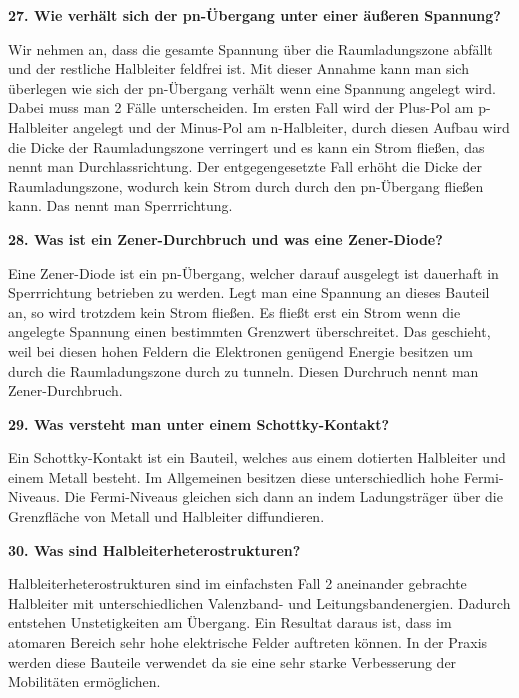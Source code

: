 \noindent\textbf{27. Wie verhält sich der pn-Übergang unter einer äußeren Spannung?}\\
\begin{addmargin}[25pt]{0pt}
Wir nehmen an, dass die gesamte Spannung über die Raumladungszone abfällt und der restliche Halbleiter feldfrei ist. Mit dieser Annahme kann man sich überlegen wie sich der pn-Übergang verhält wenn eine Spannung angelegt wird. Dabei muss man 2 Fälle unterscheiden. Im ersten Fall wird der Plus-Pol am p-Halbleiter angelegt und der Minus-Pol am n-Halbleiter, durch diesen Aufbau wird die Dicke der Raumladungszone verringert und es kann ein Strom fließen, das nennt man Durchlassrichtung. Der entgegengesetzte Fall erhöht die Dicke der Raumladungszone, wodurch kein Strom durch durch den pn-Übergang fließen kann. Das nennt man Sperrrichtung. \\
\end{addmargin}

\noindent\textbf{28. Was ist ein Zener-Durchbruch und was eine Zener-Diode?}\\
\begin{addmargin}[25pt]{0pt}
Eine Zener-Diode ist ein pn-Übergang, welcher darauf ausgelegt ist dauerhaft in Sperrrichtung betrieben zu werden. Legt man eine Spannung an dieses Bauteil an, so wird trotzdem kein Strom fließen. Es fließt erst ein Strom wenn die angelegte Spannung einen bestimmten Grenzwert überschreitet. Das geschieht, weil bei diesen hohen Feldern die Elektronen genügend Energie besitzen um durch die Raumladungszone durch zu tunneln. Diesen Durchruch nennt man Zener-Durchbruch.\\
\end{addmargin}

\noindent\textbf{29. Was versteht man unter einem Schottky-Kontakt?}\\
\begin{addmargin}[25pt]{0pt}
Ein Schottky-Kontakt ist ein Bauteil, welches aus einem dotierten Halbleiter und einem Metall besteht. Im Allgemeinen besitzen diese unterschiedlich hohe Fermi-Niveaus. Die Fermi-Niveaus gleichen sich dann an indem Ladungsträger über die Grenzfläche von Metall und Halbleiter diffundieren.\\
\end{addmargin}

\noindent\textbf{30. Was sind Halbleiterheterostrukturen?}\\
\begin{addmargin}[25pt]{0pt}
Halbleiterheterostrukturen sind im einfachsten Fall 2 aneinander gebrachte Halbleiter mit unterschiedlichen Valenzband- und Leitungsbandenergien. Dadurch entstehen Unstetigkeiten am Übergang. Ein Resultat daraus ist, dass im atomaren Bereich sehr hohe elektrische Felder auftreten können. In der Praxis werden diese Bauteile verwendet da sie eine sehr starke Verbesserung der Mobilitäten ermöglichen.\\
\end{addmargin}

